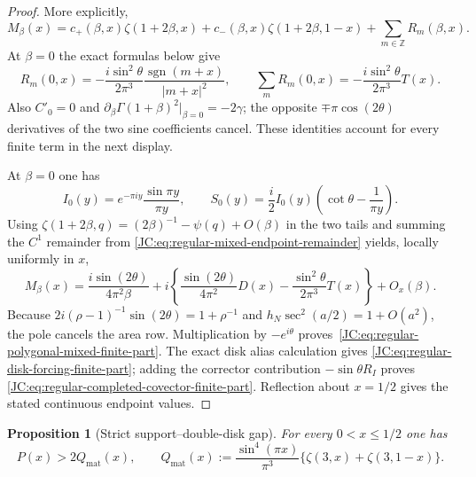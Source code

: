 \documentclass[11pt]{amsart}
\numberwithin{equation}{section}
\newtheorem{proposition}[theorem]{Proposition}
\theoremstyle{definition}
\theoremstyle{remark}
\begin{document}
\begin{proof}
More explicitly,
\[
 M_\beta(x)=c_+(\beta,x)\zeta(1+2\beta,x)
 +c_-(\beta,x)\zeta(1+2\beta,1-x)
 +\sum_{m\in\mathbb Z}R_m(\beta,x).
\]
At $\beta=0$ the exact formulas below give
\[
 R_m(0,x)=-\frac{i\sin^2\theta}{2\pi^3}
 \frac{\operatorname{sgn}(m+x)}{|m+x|^2},
 \qquad
 \sum_mR_m(0,x)=-\frac{i\sin^2\theta}{2\pi^3}T(x).
\]
Also $C'_0=0$ and
$\partial_\beta\Gamma(1+\beta)^2|_{\beta=0}=-2\gamma$; the opposite
$\mp\pi\cos(2\theta)$ derivatives of the two sine coefficients cancel.
These identities account for every finite term in the next display.

At $\beta=0$ one has
\[
 I_0(y)=e^{-\pi iy}\frac{\sin\pi y}{\pi y},\qquad
 S_0(y)=\frac i2I_0(y)
 \left(\cot\theta-\frac1{\pi y}\right).
\]
Using
$\zeta(1+2\beta,q)=(2\beta)^{-1}-\psi(q)+O(\beta)$ in the two tails and
summing the $C^1$ remainder from
\eqref{JC:eq:regular-mixed-endpoint-remainder} yields, locally uniformly in
$x$,
\[
 M_\beta(x)=\frac{i\sin(2\theta)}{4\pi^2\beta}
 +i\left\{\frac{\sin(2\theta)}{4\pi^2}D(x)
 -\frac{\sin^2\theta}{2\pi^3}T(x)\right\}+O_x(\beta).
\]
Because $2i(\rho-1)^{-1}\sin(2\theta)=1+\rho^{-1}$ and
$h_N\sec^2(a/2)=1+O(a^2)$, the pole cancels the area row.  Multiplication
by $-e^{i\theta}$ proves~\eqref{JC:eq:regular-polygonal-mixed-finite-part}.
The exact disk alias calculation gives
\eqref{JC:eq:regular-disk-forcing-finite-part}; adding the corrector
contribution $-\sin\theta R_I$ proves
\eqref{JC:eq:regular-completed-covector-finite-part}.  Reflection about
$x=1/2$ gives the stated continuous endpoint values.
\end{proof}

\begin{proposition}[Strict support--double-disk gap]
\label{JC:prop:regular-support-double-disk-gap}
For every $0<x\le1/2$ one has
\begin{equation}\label{JC:eq:regular-support-double-disk-gap}
 \boxed{P(x)>2Q_{\mathrm{mat}}(x)},\qquad
 Q_{\mathrm{mat}}(x):=\frac{\sin^4(\pi x)}{\pi^3}
 \{\zeta(3,x)+\zeta(3,1-x)\}.
\end{equation}
\end{proposition}
\end{document}
